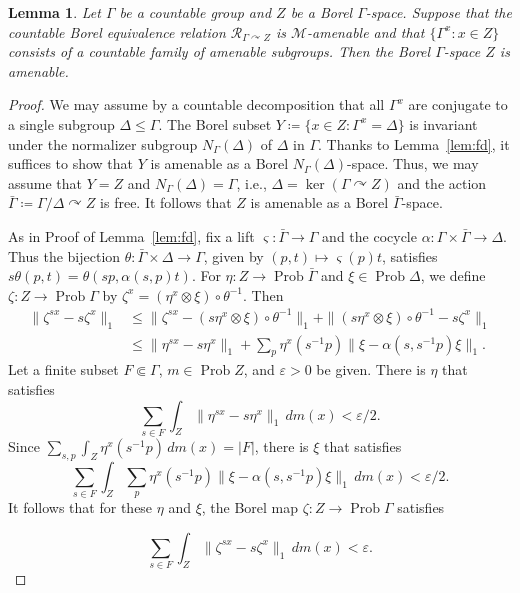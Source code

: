 \documentclass[10pt,a4paper]{amsart}
\newtheorem{lem}{Lemma}
\newcommand{\Ga}{\Gamma}
\DeclareMathOperator{\Prob}{Prob}
\newcommand{\acts}{\curvearrowright}
\newcommand{\cM}{\mathcal{M}}
\newcommand{\cR}{\mathcal{R}}
\newcommand{\ve}{\varepsilon}
\begin{document}
\begin{lem}\label{lem:borelamencriterion}
Let $\Ga$ be a countable group and 
$Z$ be a Borel $\Ga$-space. 
Suppose that the countable Borel equivalence 
relation $\cR_{\Ga\acts Z}$ is $\cM$-amenable 
and that $\{\Ga^x : x\in Z\}$ consists of 
a countable family of amenable subgroups. 
Then the Borel $\Ga$-space $Z$ is amenable.
\end{lem}

\begin{proof}
We may assume by a countable decomposition 
that all $\Ga^x$ are conjugate to a single subgroup $\Delta\le\Ga$. 
The Borel subset $Y \coloneq \{ x\in Z : \Ga^x =\Delta \}$ 
is invariant under the normalizer subgroup $N_\Ga(\Delta)$ 
of $\Delta$ in $\Ga$.
Thanks to Lemma~\ref{lem:fd}, 
it suffices to show that $Y$ is amenable as 
a Borel $N_\Ga(\Delta)$-space.
Thus, we may assume that $Y=Z$ and $N_\Ga(\Delta)=\Ga$, 
i.e., $\Delta = \ker(\Ga\acts Z)$ 
and the action $\bar{\Ga} \coloneq \Ga/\Delta\acts Z$ is free. 
It follows that $Z$ is amenable as a Borel $\bar{\Ga}$-space. 

As in Proof of Lemma~\ref{lem:fd},  
fix a lift $\varsigma\colon \bar{\Ga}\to\Ga$ and the cocycle
$\alpha\colon \Ga \times \bar{\Ga} \to \Delta$.
Thus the bijection
$\theta\colon \bar{\Ga} \times \Delta \to\Ga$, given by 
 $(p,t) \mapsto \varsigma(p)t$, 
satisfies $s\theta(p,t) = \theta( sp,\alpha(s,p)t )$. 
For $\eta\colon Z\to \Prob \bar{\Ga}$ 
and $\xi\in\Prob \Delta$, we define 
$\zeta\colon Z\to\Prob \Ga$ by 
$\zeta^x = (\eta^x\otimes \xi)\circ\theta^{-1}$. 
Then 
\begin{align*}
\| \zeta^{sx}-s\zeta^x\|_1
 &\le \| \zeta^{sx}-(s\eta^x\otimes\xi)\circ\theta^{-1}\|_1
   + \| (s\eta^x\otimes\xi)\circ\theta^{-1}- s\zeta^x\|_1\\
 &\le \| \eta^{sx}-s\eta^x\|_1 
   + \sum_p\eta^x(s^{-1}p)\|\xi-\alpha(s,s^{-1}p)\xi\|_1.
\end{align*}
Let a finite subset $F\Subset\Ga$, $m\in\Prob Z$, and $\ve>0$ be given. 
There is $\eta$ that satisfies 
\[
\sum_{s\in F}\int_Z \| \eta^{sx}-s\eta^x\|_1\,dm(x) < \ve/2.
\]
Since $\sum_{s,p}\int_Z \eta^x(s^{-1}p)\,dm(x) = |F|$, 
there is $\xi$ that satisfies 
\[
\sum_{s\in F}\int_Z \sum_p\eta^x(s^{-1}p)\|\xi-\alpha(s,s^{-1}p)\xi\|_1\,dm(x) <\ve/2.
\]
It follows that for these $\eta$ and $\xi$, 
the Borel map $\zeta\colon Z\to\Prob \Ga$ satisfies\\ 
\begin{minipage}{.9\textwidth}
\[
\sum_{s\in F}\int_Z \| \zeta^{sx}-s\zeta^x\|_1\,dm(x) < \ve.
\]
\end{minipage} 
\end{proof}
\end{document}
